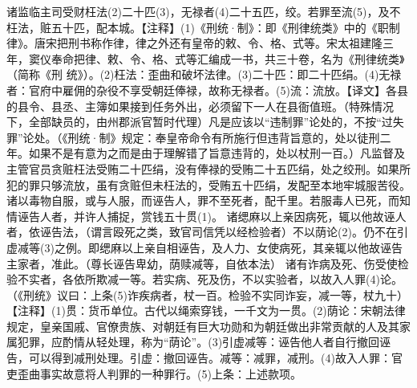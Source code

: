 \documentclass[12pt,UTF8]{ctexbook}
\begin{document}
诸监临主司受财枉法(2)二十匹(3)，无禄者(4)二十五匹，绞。若罪至流(5)，及不枉法，赃五十匹，配本城。【注释】(1)《刑统·制》：即《刑律统类》中的《职制律》。唐宋把刑书称作律，律之外还有皇帝的敕、令、格、式等。宋太祖建隆三年，窦仪奉命把律、敕、令、格、式等汇编成一书，共三十卷，名为《刑律统类》（简称《刑
统》）。(2)枉法：歪曲和破坏法律。(3)二十匹：即二十匹绢。(4)无禄者：官府中雇佣的杂役不享受朝廷俸禄，故称无禄者。(5)流：流放。【译文】各县的县令、县丞、主簿如果接到任务外出，必须留下一人在县衙值班。（特殊情况下，全部缺员的，由州郡派官暂时代理）凡是应该以“违制罪”论处的，不按“过失罪”论处。（《刑统·制》规定：奉皇帝命令有所施行但违背旨意的，处以徒刑二年。如果不是有意为之而是由于理解错了旨意违背的，处以杖刑一百。）凡监督及主管官员贪赃枉法受贿二十匹绢，没有俸禄的受贿二十五匹绢，处之绞刑。如果所犯的罪只够流放，虽有贪赃但未枉法的，受贿五十匹绢，发配至本地牢城服苦役。
诸以毒物自服，或与人服，而诬告人，罪不至死者，配千里。若服毒人已死，而知情诬告人者，并许人捕捉，赏钱五十贯(1)。
诸缌麻以上亲因病死，辄以他故诬人者，依诬告法，（谓言殴死之类，致官司信凭以经检验者）不以荫论(2)。仍不在引虚减等(3)之例。即缌麻以上亲自相诬告，及人力、女使病死，其亲辄以他故诬告主家者，准此。（尊长诬告卑幼，荫赎减等，自依本法）
诸有诈病及死、伤受使检验不实者，各依所欺减一等。若实病、死及伤，不以实验者，以故入人罪(4)论。（《刑统》议曰：上条(5)诈疾病者，杖一百。检验不实同诈妄，减一等，杖九十）【注释】(1)贯：货币单位。古代以绳索穿钱，一千文为一贯。(2)荫论：宋朝法律规定，皇亲国戚、官僚贵族、对朝廷有巨大功勋和为朝廷做出非常贡献的人及其家属犯罪，应酌情从轻处理，称为“荫论”。(3)引虚减等：诬告他人者自行撤回诬告，可以得到减刑处理。引虚：撤回诬告。减等：减罪，减刑。(4)故入人罪：官吏歪曲事实故意将人判罪的一种罪行。(5)上条：上述款项。
\end{document}
